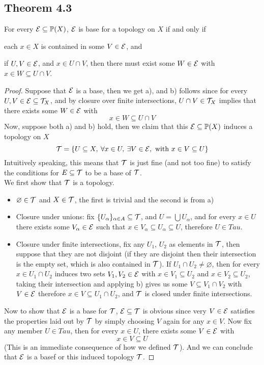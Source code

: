 \documentclass[../../main.tex]{subfiles}
\begin{document}
\subsection{Theorem 4.3}
\begin{wts}
    For every $\mathcal{E}\subseteq\mathbb{P}(X)$, $\mathcal{E}$ is base for a topology on $X$ if and only if
    \begin{enumalpha}
        \item each $x\in X$ is contained in some $V\in\mathcal{E}$, and
        \item if $U, V\in\mathcal{E}$, and $x\in U\cap V$, then there must exist some $W\in \mathcal{E}$ with $x\in W\subseteq U\cap V$.
    \end{enumalpha}
\end{wts}
\begin{proof}
    Suppose that $\mathcal{E}$ is a base, then we get a), and b) follows since for every $U, V\in \mathcal{E}\subseteq \mathcal{T}_X$, and by closure over finite intersections, $U\cap V\in\mathcal{T}_X$ implies that there exists some $W\in\mathcal{E}$  with
    \[
    x\in W\subseteq U\cap V
    \]
    Now, suppose both a) and b) hold, then we claim that this $\mathcal{E}\subseteq\mathbb{P}(X)$ induces a topology on $X$
    \[
    \mathcal{T} = \left\{U\subseteq X,\:\forall x\in U,\:\exists V\in \mathcal{E}, \text{ with } x\in V\subseteq U\right\}
    \]
    Intuitively speaking, this means that $\mathcal{T}$ is just fine (and not too fine) to satisfy the conditions for $E\subseteq \mathcal{T}$ to be a base of $\mathcal{T}$.\\
    
    We first show that $\mathcal{T}$ is a topology.
    \begin{itemize}
        \item $\varnothing\in\mathcal{T}$ and $X\in \mathcal{T}$, the first is trivial and the second is from a)
        \item Closure under unions: fix $\{U_\alpha\}_{\alpha\in A}\subseteq \mathcal{T}$, and $U = \bigcup U_\alpha$, and for every $x\in U$ there exists some $V_\alpha\in\mathcal{E}$ such that $x\in V_\alpha\subseteq U_\alpha\subseteq U$, therefore $U\in Tau$.
        \item Closure under finite intersections, fix any $U_1$, $U_2$ as elements in $\mathcal{T}$, then suppose that they are not disjoint (if they are disjoint then their intersection is the empty set, which is also contained in $\mathcal{T}$). If $U_1\cap U_2\neq\varnothing$, then for every $x\in U_1\cap U_2$ induces two sets $V_1, V_2\in\mathcal{E}$ with $x\in V_1\subseteq U_2$ and $x\in V_2\subseteq U_2$, taking their intersection and applying b) gives us some $V\subseteq V_1\cap V_2$ with $V\in\mathcal{E}$ therefore $x\in V\subseteq U_1\cap U_2$, and $\mathcal{T}$ is closed under finite intersections.
    \end{itemize}
    Now to show that $\mathcal{E}$ is a base for $\mathcal{T}$, $\mathcal{E}\subseteq\mathcal{T}$ is obvious since very $V\in\mathcal{E}$ satisfies the properties laid out by $\mathcal{T}$ by simply choosing $V$ again for any $x\in V$. Now fix any member $U\in Tau$, then for every $x\in U$, there exists some $V\in \mathcal{E}$ with
    \[
    x\in V\subseteq U
    \]
    (This is an immediate consequence of how we defined $\mathcal{T}$). And we can conclude that $\mathcal{E}$ is a basef or this induced topology $\mathcal{T}$.
\end{proof}
\end{document}
